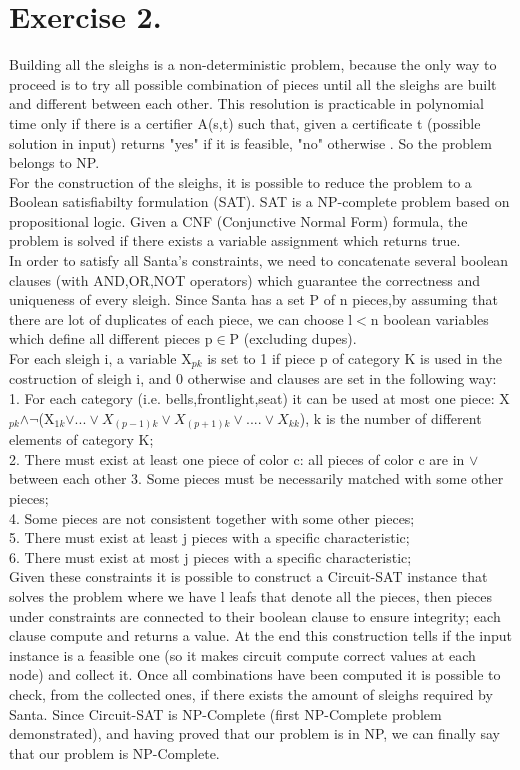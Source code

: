\documentclass[11pt]{scrartcl}
\begin{document}
\section{Exercise 2.}
Building all the sleighs is a non-deterministic problem, because the only way to proceed is to try all possible combination of pieces until all the sleighs are built and different between each other. This resolution is practicable in polynomial time only if there is a certifier A(s,t) such that, given a certificate t (possible solution in input) returns "yes" if it is feasible, "no" otherwise . So the problem belongs to NP.\\
For the construction of the sleighs, it is possible to reduce the problem to a Boolean satisfiabilty formulation (SAT). SAT is a NP-complete problem based on propositional logic. Given a CNF (Conjunctive Normal Form) formula, the problem is solved if there exists a variable assignment which returns true.\\
In order to satisfy all Santa's constraints, we need to concatenate several boolean clauses (with AND,OR,NOT operators) which guarantee the correctness and uniqueness of every sleigh. 
Since Santa has a set P of n pieces,by assuming that there are lot of duplicates of each piece, we can choose l$<$n boolean variables which define all different pieces p$\in$P (excluding dupes).\\For each sleigh i, a variable X$_{pk}$ is set to 1 if piece p of category K is used in the costruction of sleigh i, and 0 otherwise and clauses are set in the following way:\\
1. For each category (i.e. bells,frontlight,seat) it can be used at most one piece:
X$_{pk}$$\wedge$$\neg$(X$_{1k}$$\vee...\vee X_{(p-1)k} \vee X_{(p+1)k} \vee....\vee X_{kk}$), k is the number of different elements of category K;\\
2. There must exist at least one piece of color c: all pieces of color c are in $\vee$ between each other
3. Some pieces must be necessarily matched with some other pieces;\\
4. Some pieces are not consistent together with some other pieces;\\
5. There must exist at least j pieces with a specific characteristic;\\
6. There must exist at most j pieces with a specific characteristic;\\
Given these constraints it is possible to construct a Circuit-SAT instance that solves the problem where we have l leafs that denote all the pieces, then pieces under constraints are connected to their boolean clause to ensure integrity; each clause compute and returns a value. At the end this construction tells if the input instance is a feasible one (so it makes circuit compute correct values at each node) and collect it.
Once all combinations have been computed it is possible to check, from the collected ones, if there exists the amount of sleighs required by Santa.
Since Circuit-SAT is NP-Complete (first NP-Complete problem demonstrated), and having proved that our problem is in NP, we can finally say that our problem is NP-Complete.
\end{document}
